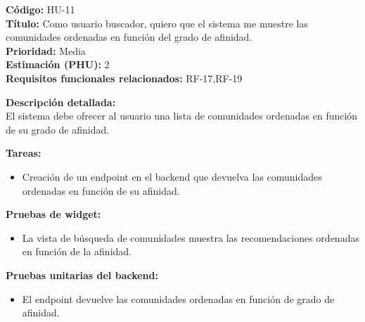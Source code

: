 \begin{tarjetaHU}
\textbf{Código:} HU-11 \\
\textbf{Título:} Como usuario buscador, quiero que el sistema me muestre las comunidades ordenadas en función del grado de afinidad. \\
\textbf{Prioridad:} Media \\
\textbf{Estimación (PHU):} 2 \\
\textbf{Requisitos funcionales relacionados:} RF-17,RF-19

\vspace{0.5em}
\textbf{Descripción detallada:} \\
El sistema debe ofrecer al usuario una lista de comunidades ordenadas en función de su grado de afinidad.

\vspace{0.5em}
\textbf{Tareas:}
\begin{itemize}[left=0pt]
  \item Creación de un endpoint en el backend que devuelva las comunidades ordenadas en función de su afinidad.
\end{itemize}

\vspace{0.5em}
\textbf{Pruebas de widget:}
\begin{itemize}[left=0pt]
  \item La vista de búsqueda de comunidades muestra las recomendaciones ordenadas en función de la afinidad.
\end{itemize}
\textbf{Pruebas unitarias del backend:}
\begin{itemize}[left=0pt]
  \item El endpoint devuelve las comunidades ordenadas en función de grado de afinidad.
\end{itemize}
\end{tarjetaHU}


